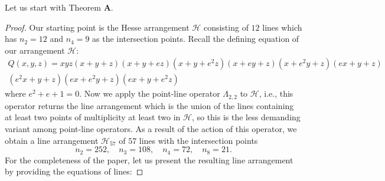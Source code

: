 \documentclass[11pt]{article}
\theoremstyle{plain}
\theoremstyle{definition}
\theoremstyle{plain}
\begin{document}
Let us start with Theorem \textbf{A}.
\begin{proof}
Our starting point is the Hesse arrangement $\mathcal{H}$ consisting of $12$ lines which has $n_{2}=12$ and $n_{4}=9$ as the intersection points. Recall the defining equation of our arrangement $\mathcal{H}$:
\begin{multline*}
Q(x,y,z) = xyz(x+y+z)(x+y+e z)(x+y+e^{2} z)(x+e y +z)(x + e^{2} y +z)(e x + y + z) \\ (e^{2}x + y+z)(ex + e^{2}y + z)(e x + y + e^{2}z) 
\end{multline*}
where $e^{2}+e+1=0$. Now we apply the point-line operator $\Lambda_{2,2}$ to $\mathcal{H}$, i.e., this operator returns the line arrangement which is the union of the lines containing at least two points of multiplicity at least two in $\mathcal{H}$, so this is the less demanding variant among point-line operators. As a result of the action of this operator, we obtain a line arrangement $\mathcal{H}_{57}$ of $57$ lines with the intersection points 
$$n_{2} = 252, \quad n_{3} = 108, \quad n_{4} = 72, \quad n_{8}=21.$$
For the completeness of the paper, let us present the resulting line arrangement by providing the equations of lines:


\end{proof}
\end{document}

